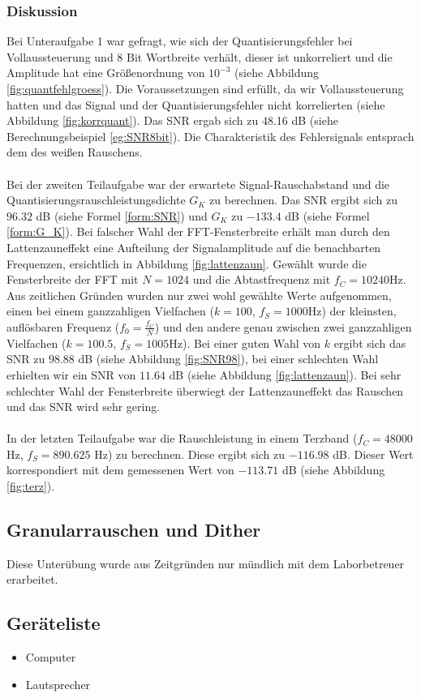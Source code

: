 \clearpage

\subsubsection{Diskussion}
Bei Unteraufgabe 1 war gefragt, wie sich der Quantisierungsfehler bei Vollaussteuerung und $8$ Bit Wortbreite verhält, dieser ist unkorreliert und die Amplitude hat eine Größenordnung von $10^{-3}$ (siehe Abbildung \ref{fig:quantfehlgroess}). Die Voraussetzungen sind erfüllt, da wir Vollaussteuerung hatten und das Signal und der Quantisierungsfehler nicht korrelierten (siehe Abbildung \ref{fig:korrquant}). Das SNR ergab sich zu 48.16 dB (siehe Berechnungsbeispiel \ref{eg:SNR8bit}). Die Charakteristik des Fehlersignals entsprach dem des weißen Rauschens.\\
\\
Bei der zweiten Teilaufgabe war der erwartete Signal-Rauschabstand und die Quantisierungsrauschleistungsdichte $G_K$ zu berechnen. Das SNR ergibt sich zu $96.32$ dB (siehe Formel \ref{form:SNR}) und $G_K$ zu $-133.4$ dB (siehe Formel \ref{form:G_K}). 
Bei falscher Wahl der FFT-Fensterbreite erhält man durch den Lattenzauneffekt eine Aufteilung der Signalamplitude auf die benachbarten Frequenzen, ersichtlich in Abbildung \ref{fig:lattenzaun}. 
Gewählt wurde die Fensterbreite der FFT mit $N = 1024$ und die Abtastfrequenz mit $f_C = 10240$Hz. 
Aus zeitlichen Gründen wurden nur zwei wohl gewählte Werte aufgenommen, einen bei einem ganzzahligen Vielfachen ($k=100$, $f_S = 1000$Hz) der kleinsten, auflösbaren Frequenz ($f_0 = \frac{f_C}{N}$) und den andere genau zwischen zwei ganzzahligen Vielfachen ($k = 100.5$, $f_S = 1005$Hz). 
Bei einer guten Wahl von $k$ ergibt sich das SNR zu $98.88$ dB (siehe Abbildung \ref{fig:SNR98}), bei einer schlechten Wahl erhielten wir ein SNR von $11.64$ dB (siehe Abbildung \ref{fig:lattenzaun}). 
Bei sehr schlechter Wahl der Fensterbreite überwiegt der Lattenzauneffekt das Rauschen und das SNR wird sehr gering.\\
\\
In der letzten Teilaufgabe war die Rauschleistung in einem Terzband ($f_C = 48000$ Hz, $f_S = 890.625$ Hz) zu berechnen. Diese ergibt sich zu $-116.98$ dB. Dieser Wert korrespondiert mit dem gemessenen Wert von $-113.71$ dB (siehe Abbildung \ref{fig:terz}). 






%
%
\pagebreak
\subsection{Granularrauschen und Dither}
Diese Unterübung wurde aus Zeitgründen nur mündlich mit dem Laborbetreuer erarbeitet. 

\subsection{Geräteliste}
\begin{itemize}
\item Computer
\item Lautsprecher
\end{itemize}
